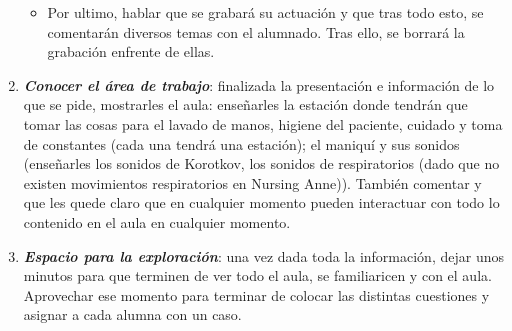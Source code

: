 \begin{enumerate}[topsep=0pt, partopsep=0pt,itemsep=0pt,parsep=0pt]
\begin{itemize}[topsep=0pt, partopsep=0pt,itemsep=0pt,parsep=0pt]
        \item Por ultimo, hablar que se grabará su actuación y que tras todo esto, se comentarán diversos temas con el alumnado. Tras ello, se borrará la grabación enfrente de ellas.
    \end{itemize}
    \item \textbf{\textit{Conocer el área de trabajo}}: finalizada la presentación e información de lo que se pide, mostrarles el aula: enseñarles la estación donde tendrán que tomar las cosas para el lavado de manos, higiene del paciente, cuidado y toma de constantes (cada una tendrá una estación); el maniquí y sus sonidos (enseñarles los sonidos de Korotkov, los sonidos de respiratorios (dado que no existen movimientos respiratorios en Nursing Anne)). También comentar y que les quede claro que en cualquier momento pueden interactuar con todo lo contenido en el aula en cualquier momento.
    \item \textbf{\textit{Espacio para la exploración}}: una vez dada toda la información, dejar unos minutos para que terminen de ver todo el aula, se familiaricen y con el aula. Aprovechar ese momento para terminar de colocar las distintas cuestiones y asignar a cada alumna con un caso.
\end{enumerate}
